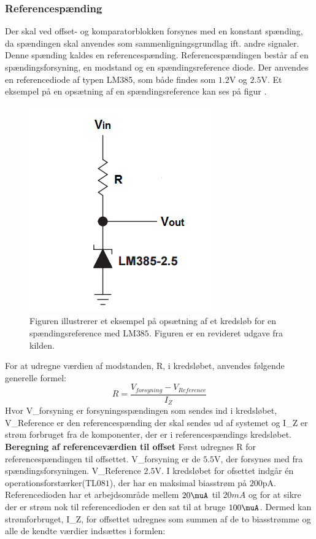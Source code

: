 \subsubsection{Referencespænding}
Der skal ved offset- og komparatorblokken forsynes med en konstant spænding, da spændingen skal anvendes som sammenligningsgrundlag ift. andre signaler. Denne spænding kaldes en referencespænding. Referencespændingen består af en spændingsforsyning, en modstand og en spændingsreference diode. Der anvendes en referencediode af typen LM385, som både findes som $1.2$V og $2.5$V. Et eksempel på en opsætning af en spændingsreference kan ses på figur .

\begin{figure}[H]
	\centering
	\includegraphics[scale=1.0]{figures/cProblemloesning/ReferenceEksempel}
	\caption{Figuren illustrerer et eksempel på opsætning af et kredsløb for en spændingsreference med LM$385$. Figuren er en revideret udgave fra kilden. \cite{Instruments2005}}
	\label{fig:Spaendingsreference}
\end{figure}

For at udregne værdien af modstanden, R, i kredsløbet, anvendes følgende generelle formel:
\begin{equation}
R=\dfrac{V_{forsyning}-V_{Reference}}{I_{Z}}
\end{equation}
Hvor V_{forsyning} er forsyningsspændingen som sendes ind i kredsløbet, V_{Reference} er den referencespænding der skal sendes ud af systemet og I_{Z} er strøm forbruget fra de komponenter, der er i referencespændings kredsløbet. 
\noindet \textbf{Beregning af referenceværdien til offset}
Først udregnes R for referencespændingen til offsettet. V_{forsyning} er de $5.5$V, der forsynes med fra spændingsforsyningen. V_{Reference} $2.5$V. I kredsløbet for ofsettet indgår én operationsforstærker(TL$081$), der har en maksimal biasstrøm på $200$pA. Referencedioden har et arbejdsområde mellem $20\muA$ til $20mA$ og for at sikre der er strøm nok til referencedioden er den sat til at bruge $100\muA$. Dermed kan strømforbruget, I_Z, for offsettet udregnes som summen af de to biasstrømme og alle de kendte værdier indsættes i formlen:

